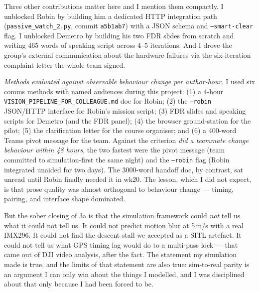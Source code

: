 Three other contributions matter here and I mention them compactly. I unblocked Robin by building him a dedicated HTTP integration path (\texttt{passive\_watch\_2.py}, commit \texttt{a5b1ab7}) with a JSON schema and \texttt{--smart-clear} flag. I unblocked Demetro by building his two FDR slides from scratch and writing 465 words of speaking script across 4--5 iterations. And I drove the group's external communication about the hardware failures via the six-iteration complaint letter the whole team signed.

\emph{Methods evaluated against observable behaviour change per author-hour.} I used six comms methods with named audiences during this project: (1) a 4-hour \texttt{VISION\_PIPELINE\_FOR\_COLLEAGUE.md} doc for Robin; (2) the \texttt{--robin} JSON/HTTP interface for Robin's mission script; (3) FDR slides and speaking scripts for Demetro (and the FDR panel); (4) the browser ground-station for the pilot; (5) the clarification letter for the course organiser; and (6) a 400-word Teams pivot message for the team. Against the criterion \emph{did a teammate change behaviour within 48 hours}, the two fastest were the pivot message (team committed to simulation-first the same night) and the \texttt{--robin} flag (Robin integrated unaided for two days). The 3000-word handoff doc, by contrast, sat unread until Robin finally needed it in wk20. The lesson, which I did not expect, is that prose quality was almost orthogonal to behaviour change --- timing, pairing, and interface shape dominated.

But the sober closing of 3a is that the simulation framework could \emph{not} tell us what it could not tell us. It could not predict motion blur at 5\,m/s with a real IMX296. It could not find the descent stall we accepted as a SITL artefact. It could not tell us what GPS timing lag would do to a multi-pass lock --- that came out of DJI video analysis, after the fact. The statement my simulation made is true, and the limits of that statement are also true: sim-to-real parity is an argument I can only win about the things I modelled, and I was disciplined about that only because I had been forced to be.

